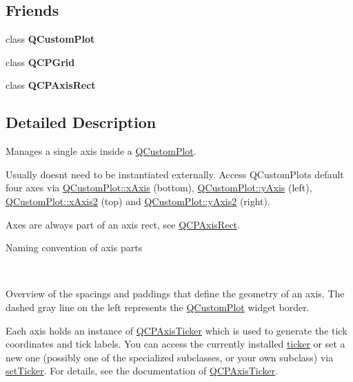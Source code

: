 \subsection*{Friends}
\begin{DoxyCompactItemize}
\item 
class {\bfseries Q\+Custom\+Plot}\hypertarget{classQCPAxis_a1cdf9df76adcfae45261690aa0ca2198}{}\label{classQCPAxis_a1cdf9df76adcfae45261690aa0ca2198}

\item 
class {\bfseries Q\+C\+P\+Grid}\hypertarget{classQCPAxis_a061e177f585549fc31f780852e2bd6fe}{}\label{classQCPAxis_a061e177f585549fc31f780852e2bd6fe}

\item 
class {\bfseries Q\+C\+P\+Axis\+Rect}\hypertarget{classQCPAxis_acbf20ecb140f66c5fd1bc64ae0762990}{}\label{classQCPAxis_acbf20ecb140f66c5fd1bc64ae0762990}

\end{DoxyCompactItemize}


\subsection{Detailed Description}
Manages a single axis inside a \hyperlink{classQCustomPlot}{Q\+Custom\+Plot}. 

Usually doesn\textquotesingle{}t need to be instantiated externally. Access Q\+Custom\+Plot\textquotesingle{}s default four axes via \hyperlink{classQCustomPlot_a9a79cd0158a4c7f30cbc702f0fd800e4}{Q\+Custom\+Plot\+::x\+Axis} (bottom), \hyperlink{classQCustomPlot_af6fea5679725b152c14facd920b19367}{Q\+Custom\+Plot\+::y\+Axis} (left), \hyperlink{classQCustomPlot_ada41599f22cad901c030f3dcbdd82fd9}{Q\+Custom\+Plot\+::x\+Axis2} (top) and \hyperlink{classQCustomPlot_af13fdc5bce7d0fabd640f13ba805c0b7}{Q\+Custom\+Plot\+::y\+Axis2} (right).

Axes are always part of an axis rect, see \hyperlink{classQCPAxisRect}{Q\+C\+P\+Axis\+Rect}.  \begin{center}Naming convention of axis parts\end{center}  ~\newline
  \begin{center}Overview of the spacings and paddings that define the geometry of an axis. The dashed gray line on the left represents the \hyperlink{classQCustomPlot}{Q\+Custom\+Plot} widget border.\end{center} 

Each axis holds an instance of \hyperlink{classQCPAxisTicker}{Q\+C\+P\+Axis\+Ticker} which is used to generate the tick coordinates and tick labels. You can access the currently installed \hyperlink{classQCPAxis_acdd672979a52b1f31e2da3518c92616d}{ticker} or set a new one (possibly one of the specialized subclasses, or your own subclass) via \hyperlink{classQCPAxis_a4ee03fcd2c74d05cd1a419b9af5cfbdc}{set\+Ticker}. For details, see the documentation of \hyperlink{classQCPAxisTicker}{Q\+C\+P\+Axis\+Ticker}. 

